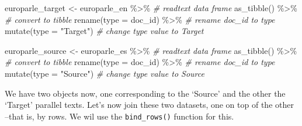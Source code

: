 \documentclass[
]{article}
\newenvironment{Shaded}{\begin{snugshade}}{\end{snugshade}}
\newcommand{\AttributeTok}[1]{\textcolor[rgb]{0.77,0.63,0.00}{#1}}
\newcommand{\CommentTok}[1]{\textcolor[rgb]{0.56,0.35,0.01}{\textit{#1}}}
\newcommand{\FunctionTok}[1]{\textcolor[rgb]{0.00,0.00,0.00}{#1}}
\newcommand{\NormalTok}[1]{#1}
\newcommand{\OtherTok}[1]{\textcolor[rgb]{0.56,0.35,0.01}{#1}}
\newcommand{\SpecialCharTok}[1]{\textcolor[rgb]{0.00,0.00,0.00}{#1}}
\newcommand{\StringTok}[1]{\textcolor[rgb]{0.31,0.60,0.02}{#1}}
\begin{document}
\begin{Shaded}
\begin{Highlighting}[]
\NormalTok{europarle\_target }\OtherTok{\textless{}{-}} 
\NormalTok{  europarle\_en }\SpecialCharTok{\%\textgreater{}\%} \CommentTok{\# readtext data frame}
  \FunctionTok{as\_tibble}\NormalTok{() }\SpecialCharTok{\%\textgreater{}\%} \CommentTok{\# convert to tibble}
  \FunctionTok{rename}\NormalTok{(}\AttributeTok{type =}\NormalTok{ doc\_id) }\SpecialCharTok{\%\textgreater{}\%} \CommentTok{\# rename doc\_id to type}
  \FunctionTok{mutate}\NormalTok{(}\AttributeTok{type =} \StringTok{"Target"}\NormalTok{) }\CommentTok{\# change type value to \textquotesingle{}Target\textquotesingle{}}

\NormalTok{europarle\_source }\OtherTok{\textless{}{-}} 
\NormalTok{  europarle\_es }\SpecialCharTok{\%\textgreater{}\%} \CommentTok{\# readtext data frame}
  \FunctionTok{as\_tibble}\NormalTok{() }\SpecialCharTok{\%\textgreater{}\%} \CommentTok{\# convert to tibble}
  \FunctionTok{rename}\NormalTok{(}\AttributeTok{type =}\NormalTok{ doc\_id) }\SpecialCharTok{\%\textgreater{}\%} \CommentTok{\# rename doc\_id to type}
  \FunctionTok{mutate}\NormalTok{(}\AttributeTok{type =} \StringTok{"Source"}\NormalTok{) }\CommentTok{\# change type value to \textquotesingle{}Source\textquotesingle{}}
\end{Highlighting}
\end{Shaded}

We have two objects now, one corresponding to the `Source' and the other the `Target' parallel texts. Let's now join these two datasets, one on top of the other --that is, by rows. We wil use the \texttt{bind\_rows()} function for this.

\begin{Shaded}
\end{Shaded}
\end{document}
